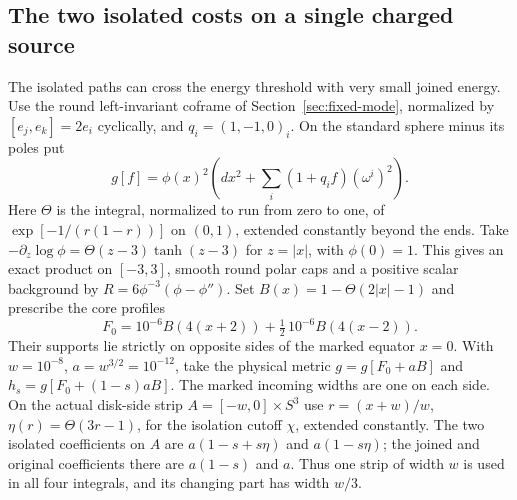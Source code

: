 \documentclass[11pt,letterpaper]{article}
\numberwithin{equation}{section}
\begin{document}
\subsection{The two isolated costs on a single charged source}
\label{sec:measured-isolation}
The isolated paths can cross the energy threshold with very small joined energy.
Use the round left-invariant coframe of Section~\ref{sec:fixed-mode}, normalized by
\([e_j,e_k]=2e_i\) cyclically, and \(q_i=(1,-1,0)_i\).
On the standard sphere minus its poles put
\[
 g[f]=\phi(x)^2\left(dx^2+\sum_i(1+q_if)(\omega^i)^2\right).
\]
Here \(\Theta\) is the integral, normalized to run from zero to one,
of \(\exp[-1/(r(1-r))]\) on \((0,1)\), extended constantly beyond
the ends. Take \(-\partial_z\log\phi=\Theta(z-3)\tanh(z-3)\)
for \(z=|x|\), with \(\phi(0)=1\). This gives an exact product on
\([-3,3]\), smooth round polar caps and a positive scalar
background by \(R=6\phi^{-3}(\phi-\phi'')\).
Set \(B(x)=1-\Theta(2|x|-1)\) and prescribe the core profiles
\[
 F_0=10^{-6}B(4(x+2))+\tfrac12\,10^{-6}B(4(x-2)).
\]
Their supports lie strictly on opposite sides of the marked
equator \(x=0\). With \(w=10^{-8}\), \(a=w^{3/2}=10^{-12}\), take
the physical metric \(g=g[F_0+aB]\) and
\(h_s=g[F_0+(1-s)aB]\). The marked incoming widths are one on
each side. On the actual disk-side strip \(A=[-w,0]\times S^3\)
use \(r=(x+w)/w\), \(\eta(r)=\Theta(3r-1)\), for the isolation
cutoff \(\chi\), extended constantly. The two isolated
coefficients on \(A\) are \(a(1-s+s\eta)\) and \(a(1-s\eta)\);
the joined and original coefficients there are \(a(1-s)\) and
\(a\). Thus one strip of width \(w\) is used in all four
integrals, and its changing part has width \(w/3\).
\end{document}

